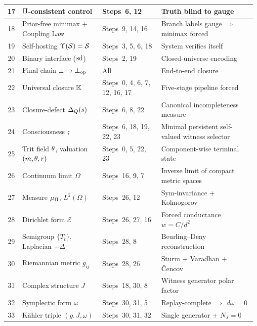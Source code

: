 \begin{table}[ht]
\begin{tabular}{@{}cllp{4.5cm}@{}}
17 & $\Pi$-consistent control & Steps~6, 12 & Truth blind to gauge \\
\midrule
18 & Prior-free minimax + Coupling Law & Steps~9, 14, 16 & Branch labels gauge $\Rightarrow$ minimax forced \\
19 & Self-hosting $\Upsilon(\mathcal{S}) = \mathcal{S}$ & Steps~3, 5, 6, 18 & System verifies itself \\
20 & Binary interface ($\mathrm{sd}$) & Steps~2, 19 & Closed-universe encoding \\
21 & Final chain $\bot \to \bot_{\mathrm{op}}$ & All & End-to-end closure \\
\midrule
22 & Universal closure $\mathbb{K}$ & Steps~0, 4, 6, 7, 12, 16, 17 & Five-stage pipeline forced \\
23 & Closure-defect $\Delta_{Q}(s)$ & Steps~6, 8, 22 & Canonical incompleteness measure \\
24 & Consciousness $\mathfrak{c}$ & Steps~6, 18, 19, 22, 23 & Minimal persistent self-valued witness selector \\
25 & Trit field $\theta$, valuation $(m, \theta, r)$ & Steps~0, 5, 22, 23 & Component-wise terminal state \\
\midrule
26 & Continuum limit $\Omega$ & Steps~16, 9, 7 & Inverse limit of compact metric spaces \\
27 & Measure $\mu_\Pi$, $L^2(\Omega)$ & Steps~26, 12 & Sym-invariance + Kolmogorov \\
28 & Dirichlet form $\mathcal{E}$ & Steps~26, 27, 16 & Forced conductance $w = C/d^2$ \\
29 & Semigroup $\{T_t\}$, Laplacian $-\Delta$ & Steps~28, 8 & Beurling--Deny reconstruction \\
30 & Riemannian metric $g_{ij}$ & Steps~28, 26 & Sturm + Varadhan + \v{C}encov \\
31 & Complex structure $J$ & Steps~18, 30, 8 & Witness generator polar factor \\
32 & Symplectic form $\omega$ & Steps~30, 31, 5 & Replay-complete $\Rightarrow$ $d\omega = 0$ \\
33 & K\"{a}hler triple $(g, J, \omega)$ & Steps~30, 31, 32 & Single generator + $N_J = 0$ \\
\bottomrule
\end{tabular}
\end{table}


